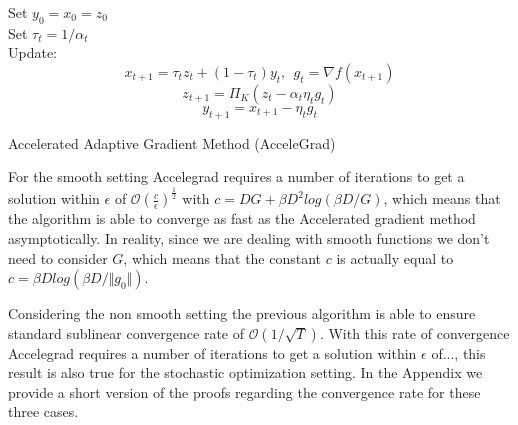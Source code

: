 \documentclass[12pt]{article}
\theoremstyle{definition}
\begin{document}
\begin{algorithm}

    Set $y_0 = x_0 = z_0$ \\
      {
      	Set $\tau_t = 1/\alpha_t$ \\
      	Update:
			$$ x_{t+1} = \tau_t z_t + (1-\tau_t) y_t, \ \ g_t = \nabla f(x_{t+1}) $$
			$$ z_{t+1} = \Pi_K (z_t - \alpha_t \eta_t g_t) $$
			$$ y_{t+1} = x_{t+1} - \eta_t g_t $$
      }
    \caption{Accelerated Adaptive Gradient Method (AcceleGrad)}
    \label{alg:accelegrad-algo}
\end{algorithm}

\newpage

For the smooth setting Accelegrad requires a number of iterations to get a solution within $\epsilon$ of $\mathcal{O}(\frac{c}{\epsilon})^{\frac{1}{2}}$ with $c = DG + \beta D^2log(\beta D/G)$, which means that the algorithm is able to converge as fast as the Accelerated gradient method asymptotically. In reality, since we are dealing with smooth functions we don't need to consider $G$, which means that the constant $c$ is actually equal to $c = \beta D  log(\beta D /\Vert g_0 \Vert)$.

Considering the non smooth setting the previous algorithm is able to ensure standard sublinear convergence rate of $\mathcal{O}(1/\sqrt T)$. With this rate of convergence Accelegrad requires a number of iterations to get a solution within $\epsilon$ of..., this result is also true for the stochastic optimization setting. In the Appendix we provide a short version of the proofs regarding the convergence rate for these three cases. 




%
%
\end{document}
